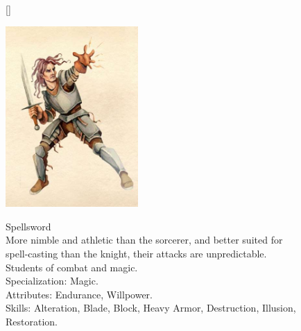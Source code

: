 \documentclass[12pt]{book}
\begin{document}
\begin{figure}[H]
[\FBwidth]
{\caption*{Spellsword\\

More nimble and athletic than the sorcerer, and better suited for spell-casting than the knight, their attacks are unpredictable. Students of combat and magic.\\

Specialization: Magic.\\

Attributes: Endurance, Willpower.\\

Skills: Alteration, Blade, Block, Heavy Armor, Destruction, Illusion, Restoration.}\label{fig:test}}
{\includegraphics[width=0.45\textwidth]{Spellsword.png}}
\end{figure}
\end{document}
